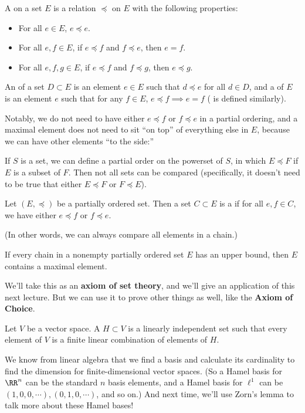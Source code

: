\begin{definition}
A  on a set $E$ is a relation $\preceq$ on $E$ with the following properties:
\begin{itemize}
\item For all $e \in E$, $e \preceq e$.
\item For all $e, f \in E$, if $e \preceq f$ and $f \preceq e$, then $e = f$.
\item For all $e, f, g \in E$, if $e \preceq f$ and $f \preceq g$, then $e \preceq g$.
\end{itemize}
An  of a set $D \subset E$ is an element $e \in E$ such that $d \preceq e$ for all $d \in D$, and a  of $E$ is an element $e$ such that for any $f \in E$, $e \preceq f \implies e = f$ ( is defined similarly).
\end{definition}

Notably, we do not need to have either $e \preceq f$ or $f \preceq e$ in a partial ordering, and a maximal element does not need to sit ``on top'' of everything else in $E$, because we can have other elements ``to the side:''

\begin{example}
If $S$ is a set, we can define a partial order on the powerset of $S$, in which $E \preceq F$ if $E$ is a subset of $F$. Then not all sets can be compared (specifically, it doesn't need to be true that either $E \preceq F$ or $F \preceq E$).
\end{example}

\begin{definition}
Let $(E, \preceq)$ be a partially ordered set. Then a set $C \subset E$ is a  if for all $e, f \in C$, we have either $e \preceq f$ or $f \preceq e$.
\end{definition}

(In other words, we can always compare all elements in a chain.)

\begin{proposition}
If every chain in a nonempty partially ordered set $E$ has an upper bound, then $E$ contains a maximal element.
\end{proposition}

We'll take this as an \textbf{axiom of set theory}, and we'll give an application of this next lecture. But we can use it to prove other things as well, like the \textbf{Axiom of Choice}.

\begin{definition}
Let $V$ be a vector space. A  $H \subset V$ is a linearly independent set such that every element of $V$ is a finite linear combination of elements of $H$. 
\end{definition}

We know from linear algebra that we find a basis and calculate its cardinality to find the dimension for finite-dimensional vector spaces. (So a Hamel basis for $\RR^n$ can be the standard $n$ basis elements, and a Hamel basis for $\ell^1$ can be $(1, 0, 0, \cdots), (0, 1, 0, \cdots)$, and so on.) And next time, we'll use Zorn's lemma to talk more about these Hamel bases!